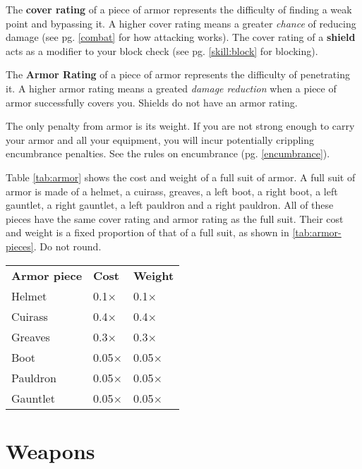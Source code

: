 \begin{multicols}{2}
    The \textbf{cover rating} of a piece of armor represents the difficulty of
    finding a weak point and bypassing it. A higher cover rating means a greater \textit{chance}
    of reducing damage (see pg. \ref{combat} for how attacking works). The cover
    rating of a \textbf{shield} acts as a modifier to your block check (see pg.
    \ref{skill:block} for blocking).

    The \textbf{Armor Rating} of a piece of armor represents the difficulty of
    penetrating it. A higher armor rating means a greated \textit{damage reduction}
    when a piece of armor successfully covers you. Shields do not have an armor
    rating.

    The only penalty from armor is its weight. If you are not strong enough to
    carry your armor and all your equipment, you will incur potentially
    crippling encumbrance penalties. See the rules on encumbrance (pg.
    \ref{encumbrance}).

    Table \ref{tab:armor} shows the cost and weight of a full suit of armor. A full
    suit of armor is made of a helmet, a cuirass, greaves, a left boot, a right
    boot, a left gauntlet, a right gauntlet, a left pauldron and a right pauldron.
    All of these pieces have the same cover rating and armor rating as the full
    suit. Their cost and weight is a fixed proportion of that of a full suit, as
    shown in \ref{tab:armor-pieces}. Do not round.
    \begin{center}
        \unclassedrowcolors
        \begin{tabularx}{0.5\textwidth}{l l l}
            \textbf{Armor piece} & \textbf{Cost} & \textbf{Weight} \\
            Helmet & 0.1$\times$ & 0.1$\times$ \\
            Cuirass & 0.4$\times$ & 0.4$\times$ \\
            Greaves & 0.3$\times$ & 0.3$\times$ \\
            Boot & 0.05$\times$ & 0.05$\times$ \\
            Pauldron & 0.05$\times$ & 0.05$\times$ \\
            Gauntlet & 0.05$\times$ & 0.05$\times$ \\
        \end{tabularx}
        \label{tab:armor-pieces}
    \end{center}

    \section{Weapons}


\end{multicols}

